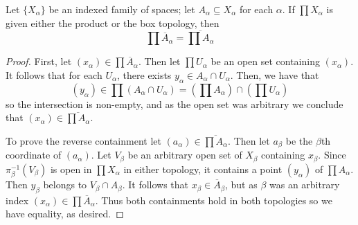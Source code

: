 \documentclass[12pt, a4paper, oneside, openright, titlepage]{book}
\begin{document}
\begin{thm}
    Let $\{X_{\alpha}\}$ be an indexed family of spaces; let $A_{\alpha} \subseteq X_{\alpha}$ for each $\alpha$. If $\prod X_{\alpha}$ is given either the product or the box topology, then \begin{equation*}
        \prod \overline{A}_{\alpha} = \overline{\prod A_{\alpha}}
    \end{equation*}
\end{thm}
\begin{proof}
    First, let $(x_{\alpha}) \in \prod \overline{A}_{\alpha}$. Then let $\prod U_{\alpha}$ be an open set containing $(x_{\alpha})$. It follows that for each $U_{\alpha}$, there exists $y_{\alpha} \in A_{\alpha} \cap U_{\alpha}$. Then, we have that $$(y_{\alpha}) \in \prod (A_{\alpha} \cap U_{\alpha}) = \left(\prod A_{\alpha}\right)\cap \left(\prod U_{\alpha}\right)$$
    so the intersection is non-empty, and as the open set was arbitrary we conclude that $(x_{\alpha}) \in \overline{\prod A_{\alpha}}$. 

    To prove the reverse containment let $(a_{\alpha}) \in \overline{\prod A_{\alpha}}$. Then let $a_{\beta}$ be the $\beta$th coordinate of $(a_{\alpha})$. Let $V_{\beta}$ be an arbitrary open set of $X_{\beta}$ containing $x_{\beta}$. Since $\pi^{-1}_{\beta}(V_{\beta})$ is open in $\prod X_{\alpha}$ in either topology, it contains a point $(y_{\alpha})$ of $\prod A_{\alpha}$. Then $y_{\beta}$ belongs to $V_{\beta}\cap A_{\beta}$. It follows that $x_{\beta} \in \overline{A}_{\beta}$, but as $\beta$ was an arbitrary index $(x_{\alpha}) \in \prod \overline{A}_{\alpha}$. Thus both containments hold in both topologies so we have equality, as desired.
\end{proof}
\end{document}
